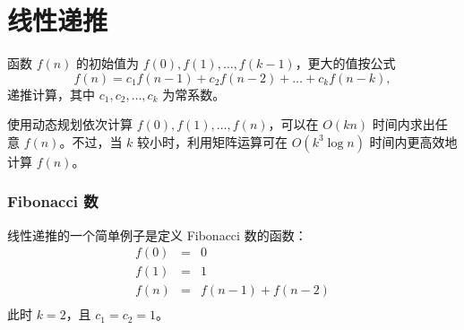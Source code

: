 \section{线性递推}


函数 $f(n)$ 的初始值为 $f(0),f(1),\ldots,f(k-1)$，更大的值按公式
\[f(n) = c_1 f(n-1) + c_2 f(n-2) + \ldots + c_k f (n-k),\]
递推计算，其中 $c_1,c_2,\ldots,c_k$ 为常系数。

使用动态规划依次计算 $f(0),f(1),\ldots,f(n)$，可以在 $O(kn)$ 时间内求出任意 $f(n)$。不过，当 $k$ 较小时，利用矩阵运算可在 $O(k^3 \log n)$ 时间内更高效地计算 $f(n)$。

\subsubsection{Fibonacci 数}


线性递推的一个简单例子是定义 Fibonacci 数的函数：
\[
\begin{array}{lcl}
f(0) & = & 0 \\
f(1) & = & 1 \\
f(n) & = & f(n-1)+f(n-2) \\
\end{array}
\]
此时 $k=2$，且 $c_1=c_2=1$。


